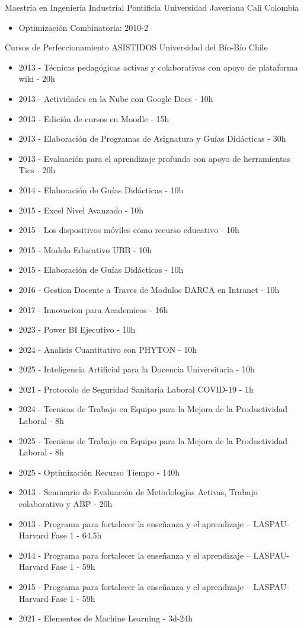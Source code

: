 
{Maestr\'ia en Ingenier\'ia Industrial}
{Pontificia Universidad Javeriana Cali}
{Colombia}
{}
{\begin{itemize}
\item Optimizaci\'on Combinatoria: 2010-2
\end{itemize}}


{Cursos de Perfeccionamiento ASISTIDOS}
{Universidad del B\'io-B\'io}
{Chile}
{}
{\begin{itemize}
\item 2013 - T\'ecnicas pedag\'ogicas activas y colaborativas con apoyo de plataforma wiki - 20h
\item 2013 - Actividades en la Nube con Google Docs - 10h
\item 2013 - Edici\'on de cursos en Moodle - 15h
\item 2013 - Elaboraci\'on de Programas de Asignatura y Gu\'ias Did\'acticas - 30h
\item 2013 - Evaluaci\'on para el aprendizaje profundo con apoyo de herramientas Tics - 20h
\item 2014 - Elaboraci\'on de Gu\'ias Did\'acticas - 10h
\item 2015 - Excel Nivel Avanzado - 10h
\item 2015 - Los dispositivos m\'oviles como recurso educativo - 10h
\item 2015 - Modelo Educativo UBB - 10h
\item 2015 - Elaboraci\'on de Gu\'ias Did\'acticas - 10h
\item 2016 - Gestion Docente a Traves de Modulos DARCA en Intranet - 10h
\item 2017 - Innovacion para Academicos - 16h
\item 2023 - Power BI Ejecutivo - 10h
\item 2024 - Analisis Cuantitativo con PHYTON - 10h
\item 2025 - Inteligencia Artificial para la Docencia Universitaria - 10h
\item 2021 - Protocolo de Seguridad Sanitaria Laboral COVID-19 - 1h
\item 2024 - Tecnicas de Trabajo en Equipo para la Mejora de la Productividad Laboral - 8h
\item 2025 - Tecnicas de Trabajo en Equipo para la Mejora de la Productividad Laboral - 8h
\item 2025 - Optimización Recurso Tiempo - 140h
\item 2013 - Seminario de Evaluaci\'on de Metodolog\'ias Activas, Trabajo colaborativo y ABP - 20h
\item 2013 - Programa para fortalecer la enseñanza y el aprendizaje – LASPAU-Harvard Fase 1 - 64.5h
\item 2014 - Programa para fortalecer la enseñanza y el aprendizaje – LASPAU-Harvard Fase 1 - 59h
\item 2015 - Programa para fortalecer la enseñanza y el aprendizaje – LASPAU-Harvard Fase 1 - 59h
\item 2021 - Elementos de Machine Learning - 3d-24h
\end{itemize}}

\clearpage